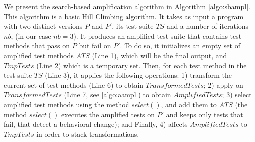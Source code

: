 We present the search-based amplification algorithm in Algorithm \autoref{algo:sbampl}.
This algorithm is a basic Hill Climbing algorithm.
It takes as input a program with two distinct versions $P$ and $P'$, its test suite $TS$ and a number of iterations $nb$, (in our case $nb=3$).
It produces an amplified test suite that contains test methods that pass on $P$ but fail on $P'$.
To do so, it initializes an empty set of amplified test methods $ATS$ (Line 1), which will be the final output, and $TmpTests$ (Line 2) which is a temporary set.
Then, for each test method in the test suite $TS$ (Line 3), it applies the following operations: 
1) transform the current set of test methods (Line 6) to obtain $TransformedTests$;
2) apply \aampl on $TransformedTests$ (Line 7, see \autoref{algo:aampl}) to obtain $AmplifiedTests$; 
3) select amplified test methods using the method $select()$, and add them to $ATS$ 
(the method $select()$ executes the amplified tests on $P'$ and keeps only tests that fail, \ie that detect a behavioral change);
and Finally, 4) affects $AmplifiedTests$ to $TmpTests$ in order to stack transformations.


